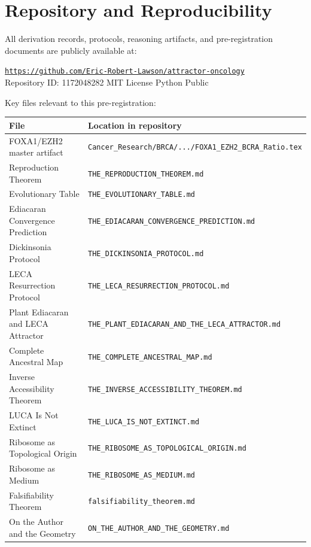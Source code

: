 \documentclass[12pt, a4paper]{article}
\theoremstyle{definition}
\theoremstyle{remark}
\begin{document}
\section*{Repository and Reproducibility}

All derivation records, protocols, reasoning artifacts, and
pre-registration documents are publicly available at:

\begin{center}
\href{https://github.com/Eric-Robert-Lawson/attractor-oncology}
{\texttt{https://github.com/Eric-Robert-Lawson/attractor-oncology}}\\[0.3em]
\small Repository ID: 1172048282 \textbar{} MIT License
\textbar{} Python \textbar{} Public
\end{center}

\noindent Key files relevant to this pre-registration:

\begin{center}
\begin{tabular}{ll}
\toprule
\textbf{File} & \textbf{Location in repository} \\
\midrule
FOXA1/EZH2 master artifact
  & \texttt{Cancer\_Research/BRCA/.../FOXA1\_EZH2\_BCRA\_Ratio.tex} \\
Reproduction Theorem
  & \texttt{THE\_REPRODUCTION\_THEOREM.md} \\
Evolutionary Table
  & \texttt{THE\_EVOLUTIONARY\_TABLE.md} \\
Ediacaran Convergence Prediction
  & \texttt{THE\_EDIACARAN\_CONVERGENCE\_PREDICTION.md} \\
Dickinsonia Protocol
  & \texttt{THE\_DICKINSONIA\_PROTOCOL.md} \\
LECA Resurrection Protocol
  & \texttt{THE\_LECA\_RESURRECTION\_PROTOCOL.md} \\
Plant Ediacaran and LECA Attractor
  & \texttt{THE\_PLANT\_EDIACARAN\_AND\_THE\_LECA\_ATTRACTOR.md} \\
Complete Ancestral Map
  & \texttt{THE\_COMPLETE\_ANCESTRAL\_MAP.md} \\
Inverse Accessibility Theorem
  & \texttt{THE\_INVERSE\_ACCESSIBILITY\_THEOREM.md} \\
LUCA Is Not Extinct
  & \texttt{THE\_LUCA\_IS\_NOT\_EXTINCT.md} \\
Ribosome as Topological Origin
  & \texttt{THE\_RIBOSOME\_AS\_TOPOLOGICAL\_ORIGIN.md} \\
Ribosome as Medium
  & \texttt{THE\_RIBOSOME\_AS\_MEDIUM.md} \\
Falsifiability Theorem
  & \texttt{falsifiability\_theorem.md} \\
On the Author and the Geometry
  & \texttt{ON\_THE\_AUTHOR\_AND\_THE\_GEOMETRY.md} \\
\bottomrule
\end{tabular}
\end{center}
\end{document}
